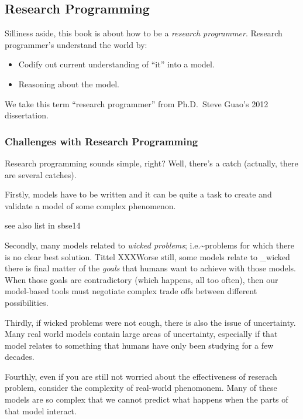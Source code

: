 \subsection{Research Programming}\label{research-programming}

Silliness aside, this book is about how to be a \emph{research
programmer}. Research programmer's understand the world by:

\begin{itemize}
\itemsep1pt\parskip0pt
\item
  Codify out current understanding of ``it'' into a model.
\item
  Reasoning about the model.
\end{itemize}

We take this term ``research programmer'' from Ph.D.~Steve Guao's 2012
dissertation.

\subsubsection{Challenges with Research
Programming}\label{challenges-with-research-programming}

Research programming sounds simple, right? Well, there's a catch
(actually, there are several catches).

Firstly, models have to be written and it can be quite a task to create
and validate a model of some complex phenomenon.

see also list in sbse14

Secondly, many models related to \emph{wicked problems};
i.e.\textasciitilde{}problems for which there is no clear best solution.
Tittel XXXWorse still, some models relate to \_wicked there is final
matter of the \emph{goals} that humans want to achieve with those
models. When those goals are contradictory (which happens, all too
often), then our model-based tools must negotiate complex trade offs
between different possibilities.

Thirdly, if wicked problems were not eough, there is also the issue of
uncertainty. Many real world models contain large areas of uncertainty,
especially if that model relates to something that humans have only been
studying for a few decades.

Fourthly, even if you are still not worried about the effectiveness of
reserach problem, consider the complexity of real-world phenomonem. Many
of these models are so complex that we cannot predict what happens when
the parts of that model interact.

